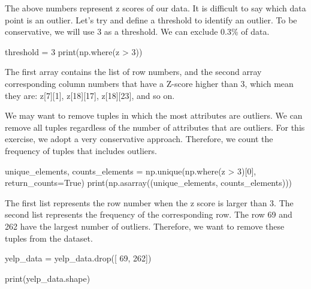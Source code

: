 \documentclass[
  letterpaper,
]{scrbook}
\newenvironment{Shaded}{\begin{snugshade}}{\end{snugshade}}
\newcommand{\BuiltInTok}[1]{\textcolor[rgb]{0.00,0.23,0.31}{#1}}
\newcommand{\DecValTok}[1]{\textcolor[rgb]{0.68,0.00,0.00}{#1}}
\newcommand{\NormalTok}[1]{\textcolor[rgb]{0.00,0.23,0.31}{#1}}
\newcommand{\OperatorTok}[1]{\textcolor[rgb]{0.37,0.37,0.37}{#1}}
\newcommand{\VariableTok}[1]{\textcolor[rgb]{0.07,0.07,0.07}{#1}}
\begin{document}
The above numbers represent z scores of our data. It is difficult to say
which data point is an outlier. Let's try and define a threshold to
identify an outlier. To be conservative, we will use 3 as a threshold.
We can exclude 0.3\% of data.

\begin{Shaded}
\begin{Highlighting}[]
\NormalTok{threshold }\OperatorTok{=} \DecValTok{3}
\BuiltInTok{print}\NormalTok{(np.where(z }\OperatorTok{\textgreater{}} \DecValTok{3}\NormalTok{))}
\end{Highlighting}
\end{Shaded}

The first array contains the list of row numbers, and the second array
corresponding column numbers that have a Z-score higher than 3, which
mean they are: z{[}7{]}{[}1{]}, z{[}18{]}{[}17{]}, z{[}18{]}{[}23{]},
and so on.

We may want to remove tuples in which the most attributes are outliers.
We can remove all tuples regardless of the number of attributes that are
outliers. For this exercise, we adopt a very conservative approach.
Therefore, we count the frequency of tuples that includes outliers.

\begin{Shaded}
\begin{Highlighting}[]
\NormalTok{unique\_elements, counts\_elements }\OperatorTok{=}\NormalTok{ np.unique(np.where(z }\OperatorTok{\textgreater{}} \DecValTok{3}\NormalTok{)[}\DecValTok{0}\NormalTok{], return\_counts}\OperatorTok{=}\VariableTok{True}\NormalTok{)}
\BuiltInTok{print}\NormalTok{(np.asarray((unique\_elements, counts\_elements)))}
\end{Highlighting}
\end{Shaded}

The first list represents the row number when the z score is larger than
3. The second list represents the frequency of the corresponding row.
The row 69 and 262 have the largest number of outliers. Therefore, we
want to remove these tuples from the dataset.

\begin{Shaded}
\begin{Highlighting}[]
\NormalTok{yelp\_data }\OperatorTok{=}\NormalTok{ yelp\_data.drop([ }\DecValTok{69}\NormalTok{, }\DecValTok{262}\NormalTok{])}

\BuiltInTok{print}\NormalTok{(yelp\_data.shape)}
\end{Highlighting}
\end{Shaded}
\end{document}
